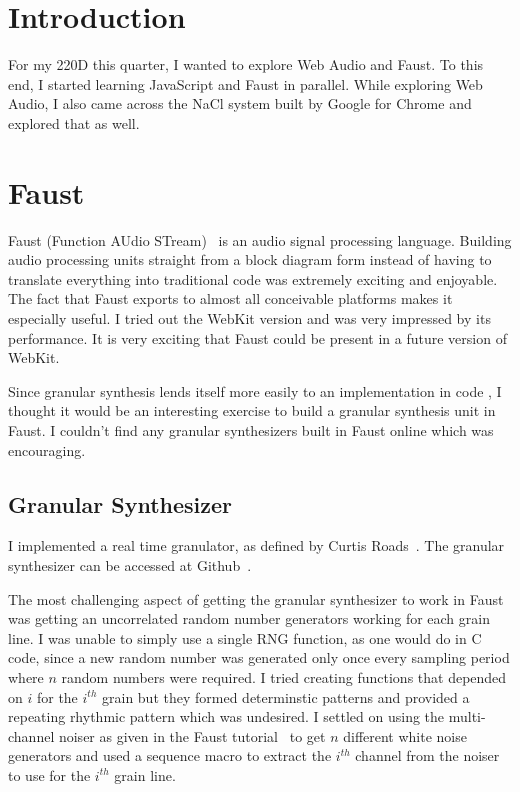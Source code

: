 \documentclass[12pt]{article}
\begin{document}
\maketitle
\section{Introduction}\label{intro}
For my 220D this quarter, I wanted to explore Web Audio and Faust. To this end, I started learning JavaScript and Faust in parallel. While exploring Web Audio, I also came across the NaCl system built by Google for Chrome and explored that as well.

\section{Faust}\label{faust}
Faust (Function AUdio STream)~\cite{Faust} is an audio signal processing language. Building audio processing units straight from a block diagram form instead of having to translate everything into traditional code was extremely exciting and enjoyable. The fact that Faust exports to almost all conceivable platforms makes it especially useful. I tried out the WebKit version and was very impressed by its performance. It is very exciting that Faust could be present in a future version of WebKit.

Since granular synthesis lends itself more easily to an implementation in code , I thought it would be an interesting exercise to build a granular synthesis unit in Faust. I couldn’t find any granular synthesizers built in Faust online which was encouraging.

\subsection{Granular Synthesizer}\label{granular-synthesis}
I implemented a real time granulator, as defined by Curtis Roads~\cite{Roads}. The granular synthesizer can be accessed at Github~\cite{Faust-Granulator}.

The most challenging aspect of getting the granular synthesizer to work in Faust was getting an uncorrelated random number generators working for each grain line. I was unable to simply use a single RNG function, as one would do in C code, since a new random number was generated only once every sampling period where $n$ random numbers were required. I tried creating functions that depended on $i$ for the $i^{th}$ grain but they formed determinstic patterns and provided a repeating rhythmic pattern which was undesired. I settled on using the multi-channel noiser as given in the Faust tutorial~\cite{faust-tutorial} to get $n$ different white noise generators and used a sequence macro to extract the $i^{th}$ channel from the noiser to use for the $i^{th}$ grain line.
\end{document}
